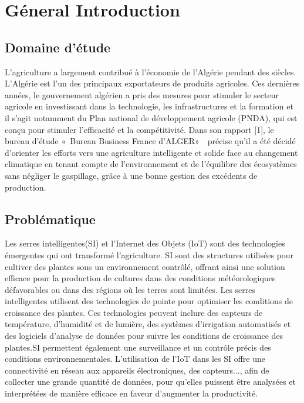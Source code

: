 \chapter*{Géneral Introduction} 
\label{chap:introduction} 


\section*{Domaine d'étude}

L’agriculture a largement contribué à l’économie de l’Algérie pendant des siècles. L’Algérie
est l’un des principaux exportateurs de produits agricoles. Ces dernières années, le
gouvernement algérien a pris des mesures pour stimuler le secteur agricole en investissant
dans la technologie, les infrastructures et la formation et il s’agit notamment du Plan
national de développement agricole (PNDA), qui est conçu pour stimuler l’efficacité et
la compétitivité. Dans son rapport [1], le bureau d’étude « Bureau Business France d’ALGER»  précise qu’il a été décidé d’orienter les efforts vers une agriculture intelligente et solide face au changement climatique en tenant compte de l’environnement et de l’équilibre des écosystèmes sans négliger le gaspillage, grâce à une bonne gestion des excédents de production.


\section*{Problématique }
Les serres intelligentes(SI) et l’Internet des Objets (IoT) sont des technologies émergentes
qui ont transformé l’agriculture. SI sont des structures utilisées pour cultiver des plantes
sous un environnement contrôlé, offrant ainsi une solution efficace pour la production
de cultures dans des conditions météorologiques défavorables ou dans des régions où les
terres sont limitées.
Les serres intelligentes utilisent des technologies de pointe pour optimiser les conditions
de croissance des plantes. Ces technologies peuvent inclure des capteurs de température,
d’humidité et de lumière, des systèmes d’irrigation automatisés et des logiciels d’analyse
de données pour suivre les conditions de croissance des plantes.SI permettent également
une surveillance et un contrôle précis des conditions environnementales.
L’utilisation de l’IoT dans les SI offre une connectivité en réseau aux appareils électroniques, des capteurs..., afin de collecter une grande quantité de données, pour qu’elles puissent être analysées et interprétées de manière efficace en faveur d’augmenter la productivité.

